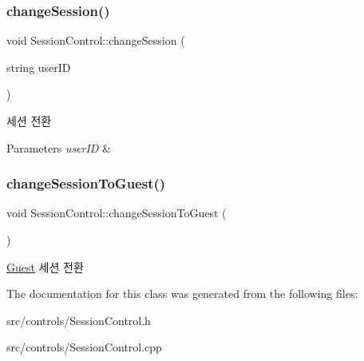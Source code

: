\subsubsection{\texorpdfstring{change\+Session()}{changeSession()}}
{\footnotesize\ttfamily void Session\+Control\+::change\+Session (\begin{DoxyParamCaption}\item[{string}]{user\+ID }\end{DoxyParamCaption})}

세션 전환 
\begin{DoxyParams}{Parameters}
{\em user\+ID} & \\
\hline
\end{DoxyParams}
\mbox{\label{class_session_control_a2b5ea3cfba3e5f303071845330a69069}} 
\subsubsection{\texorpdfstring{change\+Session\+To\+Guest()}{changeSessionToGuest()}}
{\footnotesize\ttfamily void Session\+Control\+::change\+Session\+To\+Guest (\begin{DoxyParamCaption}{ }\end{DoxyParamCaption})}

\mbox{\hyperlink{class_guest}{Guest}} 세션 전환 

The documentation for this class was generated from the following files\+:\begin{DoxyCompactItemize}
\item 
src/controls/Session\+Control.\+h\item 
src/controls/Session\+Control.\+cpp\end{DoxyCompactItemize}
